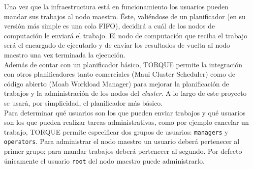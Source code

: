 Una vez que la infraestructura está en funcionamiento los usuarios pueden mandar sus trabajos al nodo maestro. Éste, valiéndose de un planificador (en su versión más simple es una cola FIFO), decidirá a cuál de los nodos de computación le enviará el trabajo. El nodo de computación que reciba el trabajo será el encargado de ejecutarlo y de enviar los resultados de vuelta al nodo maestro una vez terminada la ejecución. \\

Además de contar con un planificador básico, TORQUE permite la integración con otros planificadores tanto comerciales (Maui Cluster Scheduler) como de código abierto (Moab Workload Manager) para mejorar la planificación de trabajos y la administración de los nodos del \emph{cluster}. A lo largo de este proyecto se usará, por simplicidad, el planificador más básico. \\

Para determinar qué usuarios son los que pueden enviar trabajos y qué usuarios son los que pueden realizar tareas administrativas, como por ejemplo cancelar un trabajo, TORQUE permite especificar dos grupos de usuarios: \texttt{managers} y \texttt{operators}. Para administrar el nodo maestro un usuario deberá pertenecer al primer grupo; para mandar trabajos deberá pertenecer al segundo. Por defecto únicamente el usuario \texttt{root} del nodo maestro puede administrarlo.
